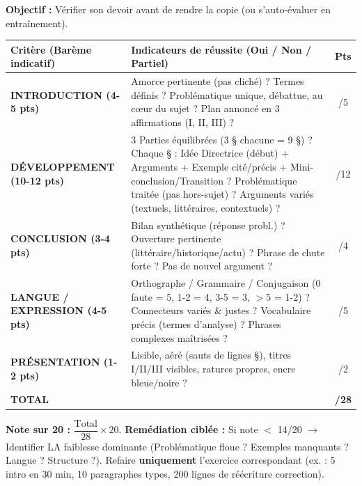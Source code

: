 \documentclass[11pt]{article}
\begin{document}
\begin{methode}
\textbf{Objectif :} Vérifier son devoir avant de rendre la copie (ou s'auto-évaluer en entraînement).
\begin{center}
\begin{tabularx}{\linewidth}{|l|X|c|}\hline
\rowcolor{popblueL} \textbf{Critère (Barème indicatif)} & \textbf{Indicateurs de réussite (Oui / Non / Partiel)} & \textbf{Pts} \\ \hline
\textbf{INTRODUCTION (4-5 pts)} & Amorce pertinente (pas cliché) ? Termes définis ? Problématique unique, débattue, au cœur du sujet ? Plan annoncé en 3 affirmations (I, II, III) ? & /5 \\ \hline
\textbf{DÉVELOPPEMENT (10-12 pts)} & 3 Parties équilibrées (3 § chacune = 9 §) ? Chaque § : Idée Directrice (début) + Arguments + Exemple cité/précis + Mini-conclusion/Transition ? Problématique traitée (pas hors-sujet) ? Arguments variés (textuels, littéraires, contextuels) ? & /12 \\ \hline
\textbf{CONCLUSION (3-4 pts)} & Bilan synthétique (réponse probl.) ? Ouverture pertinente (littéraire/historique/actu) ? Phrase de chute forte ? Pas de nouvel argument ? & /4 \\ \hline
\textbf{LANGUE / EXPRESSION (4-5 pts)} & Orthographe / Grammaire / Conjugaison (0 faute = 5, 1-2 = 4, 3-5 = 3, $>$5 = 1-2) ? Connecteurs variés \& justes ? Vocabulaire précis (termes d'analyse) ? Phrases complexes maîtrisées ? & /5 \\ \hline
\textbf{PRÉSENTATION (1-2 pts)} & Lisible, aéré (sauts de lignes §), titres I/II/III visibles, ratures propres, encre bleue/noire ? & /2 \\ \hline
\textbf{TOTAL} &  & \textbf{/28} \\ \hline
\end{tabularx}
\end{center}
\textbf{Note sur 20 :} $\dfrac{\text{Total}}{28} \times 20$.
\textbf{Remédiation ciblée :} Si note $<$ 14/20 $\to$ Identifier LA faiblesse dominante (Problématique floue ? Exemples manquants ? Langue ? Structure ?). Refaire \textbf{uniquement} l'exercice correspondant (ex. : 5 intro en 30 min, 10 paragraphes types, 200 lignes de réécriture correction).
\end{methode}
\end{document}
